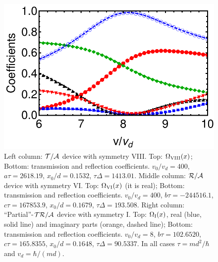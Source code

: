 \begin{figure}
\begin{center}
		\includegraphics[width=0.29\linewidth]{Figures/asym_fig_1_2_tr_a_8.pdf}
	\end{center}
	\caption{Left column: ${\cal T/A}$ device with symmetry VIII.
	Top: $\Omega_{\rm VIII}(x)$;
	Bottom:  transmission and reflection coefficients. $v_0/v_d=400$, $a\tau = 2618.19$,
	$x_0/d = 0.1532$, $\tau\Delta = 1413.01$.
	Middle column: ${\cal R/A}$ device with symmetry VI.
	Top: $\Omega_{\rm VI} (x)$ (it is real); Bottom:  transmission and reflection coefficients. $v_0/v_d=400$,
	$b \tau =  -244516.1$,
	$c\tau = 167853.9$,
	$x_0/d = 0.1679$,
	$\tau\Delta= 193.508$.
	Right column: ``Partial''-${\cal TR/A}$ device with symmetry I.
	Top:  $\Omega_{\rm I}(x)$, real (blue, solid line) and imaginary parts (orange, dashed line);
	Bottom: transmission and reflection coefficients. $v_0/v_d=8$, $b\tau =  102.6520$,
	$c \tau =  165.8355$,
	$x_0/d = 0.1648$,
	$\tau\Delta= 90.5337$. In all cases $\tau={m d^2}/{\hbar}$ and $v_{d} = {\hbar}/({m d})$.
	\label{fig_t_a}}
\end{figure}

